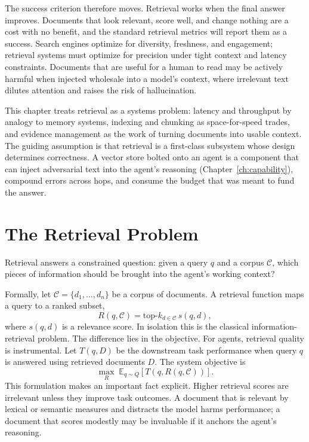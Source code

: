 \documentclass[11pt]{book}
\begin{document}
The success criterion therefore moves. Retrieval works when the final answer improves. Documents that look relevant, score well, and change nothing are a cost with no benefit, and the standard retrieval metrics will report them as a success. Search engines optimize for diversity, freshness, and engagement; retrieval systems must optimize for precision under tight context and latency constraints. Documents that are useful for a human to read may be actively harmful when injected wholesale into a model's context, where irrelevant text dilutes attention and raises the risk of hallucination.

This chapter treats retrieval as a systems problem: latency and throughput by analogy to memory systems, indexing and chunking as space-for-speed trades, and evidence management as the work of turning documents into usable context. The guiding assumption is that retrieval is a first-class subsystem whose design determines correctness. A vector store bolted onto an agent is a component that can inject adversarial text into the agent's reasoning (Chapter~\ref{ch:capability}), compound errors across hops, and consume the budget that was meant to fund the answer.

\section{The Retrieval Problem}

Retrieval answers a constrained question: given a query $q$ and a corpus $\mathcal{C}$, which pieces of information should be brought into the agent's working context?

Formally, let $\mathcal{C} = \{d_1, \ldots, d_n\}$ be a corpus of documents. A retrieval function maps a query to a ranked subset,
\[
R(q, \mathcal{C}) = \text{top-}k_{d \in \mathcal{C}} \, s(q,d),
\]
where $s(q,d)$ is a relevance score. In isolation this is the classical information-retrieval problem. The difference lies in the objective. For agents, retrieval quality is instrumental. Let $T(q, D)$ be the downstream task performance when query $q$ is answered using retrieved documents $D$. The system objective is
\[
\max_{R} \; \mathbb{E}_{q \sim Q}\left[ T(q, R(q, \mathcal{C})) \right].
\]
This formulation makes an important fact explicit. Higher retrieval scores are irrelevant unless they improve task outcomes. A document that is relevant by lexical or semantic measures and distracts the model harms performance; a document that scores modestly may be invaluable if it anchors the agent's reasoning.
\end{document}
